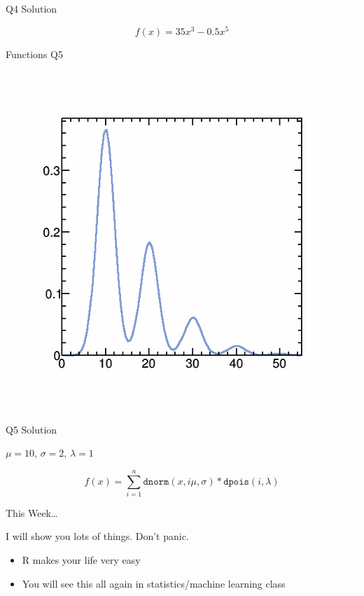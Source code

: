 \documentclass{beamer}
\begin{document}
\begin{frame}{Q4 Solution}

\[
f(x) = 35x^{3} - 0.5x^{5} 
\]

\end{frame}

\begin{frame}{Functions Q5}
\begin{center}
\includegraphics[scale=0.3]{pics/wk3/q5.png}
\end{center}
\end{frame}


\begin{frame}{Q5 Solution}

$\mu = 10$, $\sigma = 2$, $\lambda = 1$

\[
f(x) = \sum_{i=1}^{n}\texttt{dnorm}(x, i\mu, \sigma)*\texttt{dpois}(i,\lambda)
\]


\end{frame}


\begin{frame}{This Week\ldots}

I will show you lots of things.  Don't panic.
\begin{itemize}
\item R makes your life very easy
\item You will see this all again in statistics/machine learning class
\end{itemize}

\end{frame}
\end{document}
